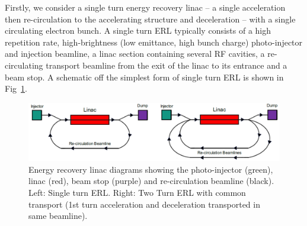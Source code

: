 \documentclass[../main.tex]{subfiles}
\begin{document}
Firstly, we consider a single turn energy recovery linac -- a single acceleration then re-circulation to the accelerating structure and deceleration -- with a single circulating electron bunch. A single turn ERL typically consists of a high repetition rate, high-brightness (low emittance, high bunch charge) photo-injector \cite{ben2016superconducting} and injection beamline, a linac section containing several RF cavities, a re-circulating transport beamline from the exit of the linac to its entrance and a beam stop. A schematic off the simplest form of single turn ERL is shown in Fig~\ref{fig:ERL_schematics}. 
\begin{figure}[!h]
\centering
\includegraphics[width=\textwidth]{Figures/Energy_Recovery_Linac_Design/single_multi_turn_ERL.pdf}
\caption{Energy recovery linac diagrams showing the photo-injector (green), linac (red), beam stop (purple) and re-circulation beamline (black). Left: Single turn ERL. Right: Two Turn ERL with common transport (1st turn acceleration and deceleration transported in same beamline). }
\label{fig:ERL_schematics}
\end{figure}
\end{document}
